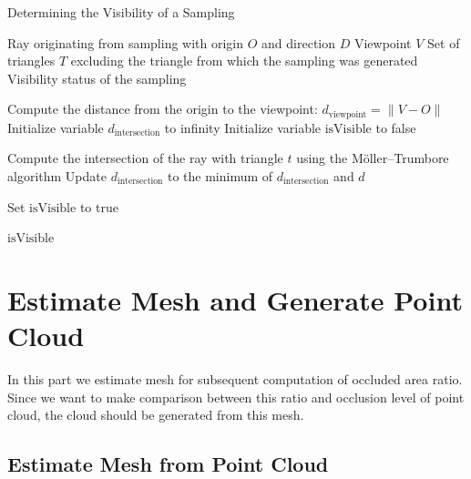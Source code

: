 \documentclass[11pt, a4paper,oneside,chapterprefix=false]{scrbook}
\begin{document}
\begin{algorithm}[H]
\caption{Determining the Visibility of a Sampling}\label{alg:visibility_sampling}
\begin{algorithmic}
\Require Ray originating from sampling with origin \( O \) and direction \( D \)
\Require Viewpoint \( V \)
\Require Set of triangles \( T \) excluding the triangle from which the sampling was generated
\Ensure Visibility status of the sampling

\State Compute the distance from the origin to the viewpoint: \( d_{\text{viewpoint}} = \| V - O \| \)
\State Initialize variable \( d_{\text{intersection}} \) to infinity
\State Initialize variable \( \text{isVisible} \) to false

    \State Compute the intersection of the ray with triangle \( t \) using the Möller–Trumbore algorithm
        \State Update \( d_{\text{intersection}} \) to the minimum of \( d_{\text{intersection}} \) and \( d \)
    \EndIf
\EndFor

    \State Set \( \text{isVisible} \) to true  
\EndIf

\State \Return \( \text{isVisible} \)
\end{algorithmic}
\end{algorithm}
 
\section{Estimate Mesh and Generate Point Cloud} \label{sec:estimate mesh and generate point cloud}

In this part we estimate mesh for subsequent computation of occluded area ratio. Since we want to make comparison between this ratio and occlusion level of point cloud, the cloud should be generated from this mesh. 

\subsection{Estimate Mesh from Point Cloud} \label{par:estimate mesh from point cloud}
\end{document}
